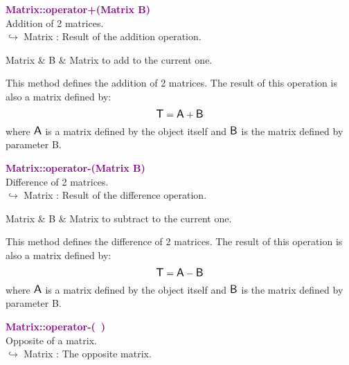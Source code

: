 \textcolor{purple}{\textbf{Matrix::operator+(Matrix B)}}\label{Matrix::operator+(Matrix B)}\\
Addition of 2 matrices.\\ \hspace*{10mm}$\hookrightarrow$ Matrix : Result of the addition operation.

\begin{tcolorbox}[width=\textwidth,myArgs,tabularx={ll|R}]
Matrix & B & Matrix to add to the current one.
\end{tcolorbox}

This method defines the addition of 2 matrices.
The result of this operation is also a matrix defined by:
\begin{equation*}
\mbox{\large\ensuremath{\mathsf{T}}} = \mbox{\large\ensuremath{\mathsf{A}}} + \mbox{\large\ensuremath{\mathsf{B}}}
\end{equation*}
where $\mbox{\large\ensuremath{\mathsf{A}}}$ is a matrix defined by the object itself and $\mbox{\large\ensuremath{\mathsf{B}}}$ is the matrix defined by parameter B.

\textcolor{purple}{\textbf{Matrix::operator-(Matrix B)}}\label{Matrix::operator-(Matrix B)}\\
Difference of 2 matrices.\\ \hspace*{10mm}$\hookrightarrow$ Matrix : Result of the difference operation.

\begin{tcolorbox}[width=\textwidth,myArgs,tabularx={ll|R}]
Matrix & B & Matrix to subtract to the current one.
\end{tcolorbox}

This method defines the difference of 2 matrices.
The result of this operation is also a matrix defined by:
\begin{equation*}
\mbox{\large\ensuremath{\mathsf{T}}} = \mbox{\large\ensuremath{\mathsf{A}}} - \mbox{\large\ensuremath{\mathsf{B}}}
\end{equation*}
where $\mbox{\large\ensuremath{\mathsf{A}}}$ is a matrix defined by the object itself and $\mbox{\large\ensuremath{\mathsf{B}}}$ is the matrix defined by parameter B.

\textcolor{purple}{\textbf{Matrix::operator-(~)}}\label{Matrix::operator-()}\\
Opposite of a matrix.\\ \hspace*{10mm}$\hookrightarrow$ Matrix : The opposite matrix.

